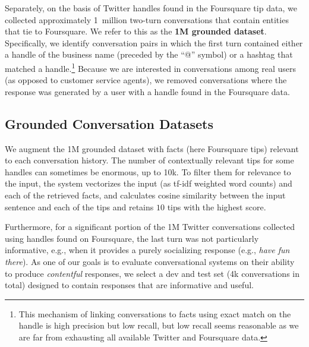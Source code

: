 \documentclass[letterpaper]{article}
\begin{document}
Separately, on the basis of Twitter handles found in the Foursquare tip data, we collected approximately 1~million two-turn conversations that contain entities that tie to Foursquare. We refer to this as
the {\bf 1M grounded dataset}.
Specifically, we identify conversation pairs 
in which the first turn contained either a handle of the business name (preceded by the ``@'' symbol) or a hashtag that matched a handle.\footnote{This mechanism of linking conversations to facts using exact match on the handle is high precision but low recall, but low recall seems reasonable as we are far from exhausting all available Twitter and Foursquare data.}
Because we are interested in conversations among real users (as opposed to customer service agents), we removed conversations where the response was generated by a user with a handle found in the Foursquare data.

\subsection{Grounded Conversation Datasets}

We augment the 1M grounded dataset with facts (here Foursquare tips) relevant to each conversation history. The number of contextually relevant tips for some handles can sometimes be enormous, up to 10k. To filter them for relevance to the input, the system vectorizes the input (as tf-idf weighted word counts) and each of the retrieved facts, and calculates cosine similarity between the input sentence and each of the tips and retains $10$ tips with the highest score.

Furthermore, for a significant portion of the 1M Twitter conversations collected using handles found on Foursquare, the last turn was not particularly informative, e.g., when it provides a purely socializing response (e.g., {\it have fun there}).
As one of our goals is to evaluate conversational systems
on their ability to produce {\it contentful} responses, we select
a dev and test set (4k conversations in total) designed to contain
responses that are informative and useful.
\end{document}
